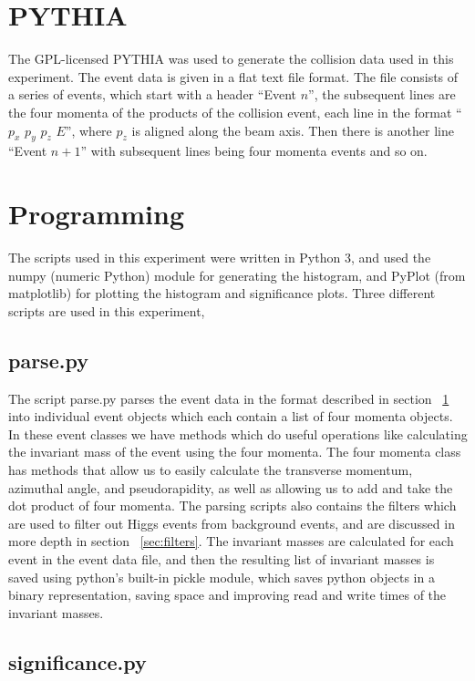 \documentclass[11pt]{amsart}
\begin{document}
\begin{multicols}{2}
\section{PYTHIA}
\label{sec:pythia}

The GPL-licensed PYTHIA was used to generate the collision data used in this experiment. \cite{pythia} The event data is given in a flat text file format. The file consists of a series of events, which start with a header ``Event $n$'', the subsequent lines are the four momenta of the products of the collision event, each line in the format ``$p_x$ $p_y$ $p_z$ $E$'', where $p_z$ is aligned along the beam axis. Then there is another line ``Event $n+1$'' with subsequent lines being four momenta events and so on.

\section{Programming}

The scripts used in this experiment were written in Python 3, and used the numpy (numeric Python) module for generating the histogram, and PyPlot (from matplotlib) for plotting the histogram and significance plots. Three different scripts are used in this experiment,

\subsection{parse.py}

The script parse.py parses the event data in the format described in section ~\ref{sec:pythia} into individual event objects which each contain a list of four momenta objects. In these event classes we have methods which do useful operations like calculating the invariant mass of the event using the four momenta. The four momenta class has methods that allow us to easily calculate the transverse momentum, azimuthal angle, and pseudorapidity, as well as allowing us to add and take the dot product of four momenta. The parsing scripts also contains the filters which are used to filter out Higgs events from background events, and are discussed in more depth in section ~\ref{sec:filters}. The invariant masses are calculated for each event in the event data file, and then the resulting list of invariant masses is saved using python's built-in pickle module, which saves python objects in a binary representation, saving space and improving read and write times of the invariant masses.

\subsection{significance.py}


\end{multicols}
\end{document}
